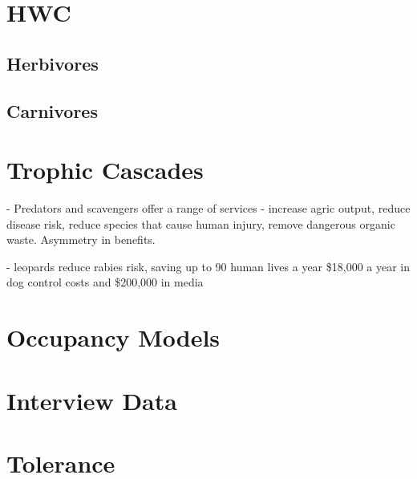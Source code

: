 \section{HWC}

\subsection{Herbivores}

\subsection{Carnivores}

\section{Trophic Cascades}

\cite{O_Bryan_2018} - Predators and scavengers offer a range of services - increase agric output, reduce disease risk, reduce species that cause human injury, remove dangerous organic waste. Asymmetry in benefits.

\cite{Braczkowski_2018} - leopards reduce rabies risk, saving up to 90 human lives a year  \$18,000 a year in dog control costs and \$200,000 in media

\section{Occupancy Models}

\section{Interview Data}

\section{Tolerance}
